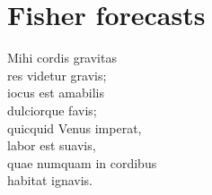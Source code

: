 \chapter{Fisher forecasts}
\label{chapter:fishers}

Mihi cordis gravitas \\
res videtur gravis; \\
iocus est amabilis \\
dulciorque favis; \\
quicquid Venus imperat, \\
labor est suavis, \\
quae numquam in cordibus \\
habitat ignavis.